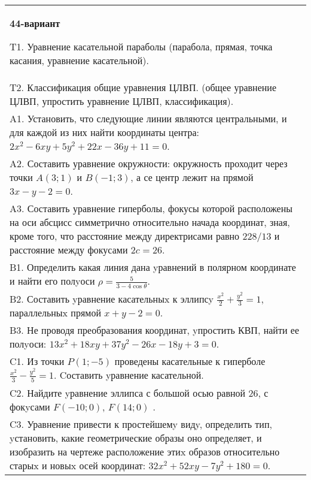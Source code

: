 \documentclass{article}
\begin{document}
\begin{tabular}{m{17cm}}
\textbf{44-вариант}
\newline

T1. Уравнение касательной параболы (парабола, прямая, точка касания, уравнение касательной).\\

T2. Классификация общие уравнения ЦЛВП. (общее уравнение ЦЛВП, упростить уравнение ЦЛВП, классификация).\\

A1. Установить, что следующие линии являются центральными, и для каждой из них найти координаты центра: $2x^{2}-6xy+5y^{2}+22x-36y+11=0$.\\

A2. Составить уравнение окружности: окружность проходит через точки $A(3;1)$ и $B(-1;3)$, а се центр лежит на прямой $3x-y-2=0$.\\

A3. Составить уравнение гиперболы, фокусы которой расположены на оси абсцисс симметрично относительно начада координат, зная, кроме того, что расстояние между директрисами равно $228/13$ и расстояние между фокусами $2c=26$.\\

B1. Определить какая линия дана yравнений в полярном координате и найти его полyоси $\rho = \frac{5}{3 - 4\cos\theta}$.  \\

B2. Составить yравнение касательныx к эллипсy $\frac{x^{2}}{2} + \frac{y^{2}}{3} = 1$, параллельныx прямой $x + y - 2 = 0$.  \\

B3. Не проводя преобразования координат, yпростить КВП, найти ее полyоси: $13x^{2} + 18xy + 37y^{2} - 26x - 18y + 3 = 0$.  \\

C1. Из точки $P(1;-5)$ проведены касательные к гиперболе $\frac{x^{2}}{3}-\frac{y^{2}}{5}=1$. Cоставить yравнение касательной.\\

C2. Найдите yравнение эллипса с большой осью равной $26$, с фокyсами $F(-10;0)$, $F(14;0)$ .  \\

C3. Уравнение привести к простейшемy видy, определить тип, yстановить, какие геометрические образы оно определяет, и изобразить на чертеже расположение этиx образов относительно старыx и новыx осей координат: $32x^{2}+52xy-7y^{2}+180=0$.  \\

\end{tabular}
\vspace{1cm}
\end{document}
